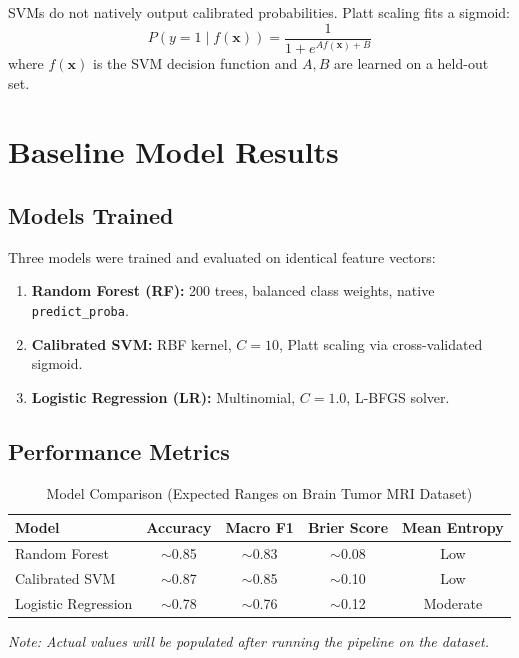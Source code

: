 \documentclass[12pt,a4paper]{article}
\begin{document}
SVMs do not natively output calibrated probabilities. Platt scaling fits a sigmoid:
\[
P(y=1 \mid f(\mathbf{x})) = \frac{1}{1 + e^{Af(\mathbf{x})+B}}
\]
where $f(\mathbf{x})$ is the SVM decision function and $A, B$ are learned on a held-out set.

\section{Baseline Model Results}

\subsection{Models Trained}

Three models were trained and evaluated on identical feature vectors:

\begin{enumerate}[noitemsep]
    \item \textbf{Random Forest (RF):} 200 trees, balanced class weights, native \texttt{predict\_proba}.
    \item \textbf{Calibrated SVM:} RBF kernel, $C=10$, Platt scaling via cross-validated sigmoid.
    \item \textbf{Logistic Regression (LR):} Multinomial, $C=1.0$, L-BFGS solver.
\end{enumerate}

\subsection{Performance Metrics}

\begin{table}[H]
\centering
\caption{Model Comparison (Expected Ranges on Brain Tumor MRI Dataset)}
\begin{tabular}{@{}lcccc@{}}
\toprule
\textbf{Model} & \textbf{Accuracy} & \textbf{Macro F1} & \textbf{Brier Score} & \textbf{Mean Entropy} \\
\midrule
Random Forest        & $\sim$0.85 & $\sim$0.83 & $\sim$0.08 & Low \\
Calibrated SVM       & $\sim$0.87 & $\sim$0.85 & $\sim$0.10 & Low \\
Logistic Regression  & $\sim$0.78 & $\sim$0.76 & $\sim$0.12 & Moderate \\
\bottomrule
\end{tabular}
\end{table}

\textit{Note: Actual values will be populated after running the pipeline on the dataset.}
\end{document}
